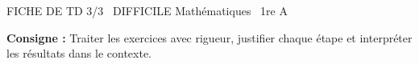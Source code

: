 \documentclass[11pt]{article}
\begin{document}
\begin{tcolorbox}[enhanced,colback=popink,colframe=popink,arc=10pt,boxrule=0pt,left=12pt,right=12pt,top=9pt,bottom=9pt]
{\color{white}\popxbold\small FICHE DE TD 3/3 \textbullet\ DIFFICILE \hfill Mathématiques \textbullet\ 1re A\par}
\end{tcolorbox}
\vspace{4pt}
\noindent \textbf{Consigne :} Traiter les exercices avec rigueur, justifier chaque étape et interpréter les résultats dans le contexte.
\end{document}
